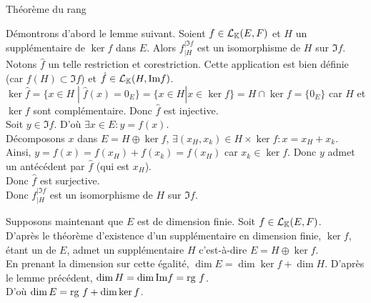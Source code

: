\documentclass{article}
\begin{document}
	\begin{question_kholle}
		[Si $E$ est de dimension finie alors pour toute $f \in \mathcal{L}_\K(E, F)$ application linéaire,
		\begin{equation}
			\dim E = \rg f + \dim \ker f
		\end{equation}]
		{Théorème du rang}
		
		Démontrons d'abord le lemme suivant.
		Soient $f \in \mathcal{L}_\K(E, F)$ et $H$ un supplémentaire de $\ker f$ dans $E$.
		Alors $f_{|H}^{|\Im f}$ est un isomorphisme de $H$ sur $\Im f$. \\
		Notons $\hat{f}$ un telle restriction et corestriction. Cette application est bien définie (car $f(H) \subset \Im f$) et $\hat{f} \in \mathcal{L}_{\mathbb K}(H, \text{Im} f)$. \\
		$\ker \hat{f} = \{ x \in H \;|\; \hat{f}(x) = 0_E \} = \{ x \in H | x \in \ker f \} = H \cap \ker f = \{0_E\}$  car $H$ et $\ker f$ sont complémentaire.
		Donc $\hat{f}$ est injective. \\
		Soit $y \in \Im f$. D'où $\exists x \in E: y = f(x)$. \\
		Décomposons $x$ dans $E = H \oplus \ker f$, $\exists (x_H, x_k) \in H \times \ker f : x = x_H + x_k$. \\
		Ainsi, $y = f(x) = f(x_H) + f(x_k)= f(x_H)$ car $x_k \in \ker f$.
		Donc $y$ admet un antécédent par $\hat{f}$ (qui est $x_H$). \\
		Donc $\hat{f}$ est surjective. \\
		Donc $f_{|H}^{|\Im f}$ est un isomorphisme de $H$ sur $\Im f$.
		
		Supposons maintenant que $E$ est de dimension finie.
		Soit $f \in \mathcal{L}_\K(E, F)$. \\
		D'après le théorème d'existence d'un supplémentaire en dimension finie, $\ker f$, étant un \sev de $E$, admet un supplémentaire $H$ c'est-à-dire $E = H  \oplus \ker f$. \\
		En prenant la dimension sur cette égalité, $\dim E = \dim \ker f + \dim H$.
		D'après le lemme précédent, $\dim H = \dim \text{Im} f = \text{rg } f$. \\
		D'où $\dim E = \text{rg } f + \dim \ker f$.
	\end{question_kholle}
	
\end{document}
